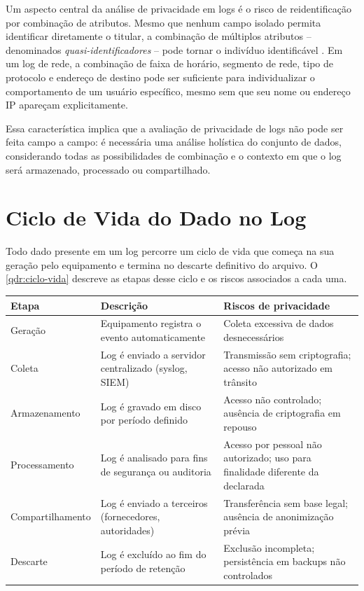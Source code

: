 Um aspecto central da análise de privacidade em logs é o risco de reidentificação por combinação de atributos. Mesmo que nenhum campo isolado permita identificar diretamente o titular, a combinação de múltiplos atributos -- denominados \textit{quasi-identificadores} -- pode tornar o indivíduo identificável \cite{sweeney2002kanonymity}. Em um log de rede, a combinação de faixa de horário, segmento de rede, tipo de protocolo e endereço de destino pode ser suficiente para individualizar o comportamento de um usuário específico, mesmo sem que seu nome ou endereço IP apareçam explicitamente.

Essa característica implica que a avaliação de privacidade de logs não pode ser feita campo a campo: é necessária uma análise holística do conjunto de dados, considerando todas as possibilidades de combinação e o contexto em que o log será armazenado, processado ou compartilhado.

\section{Ciclo de Vida do Dado no Log}
\label{sec:ciclo-vida}

Todo dado presente em um log percorre um ciclo de vida que começa na sua geração pelo equipamento e termina no descarte definitivo do arquivo. O \autoref{qdr:ciclo-vida} descreve as etapas desse ciclo e os riscos associados a cada uma.

\begin{quadro}[htb]
    \caption{\label{qdr:ciclo-vida}Ciclo de vida do dado em logs de infraestrutura}
    \begin{tabular}{|p{2.5cm}|p{4.5cm}|p{6.8cm}|}
        \hline
        \textbf{Etapa} & \textbf{Descrição} & \textbf{Riscos de privacidade} \\
        \hline
        Geração & Equipamento registra o evento automaticamente & Coleta excessiva de dados desnecessários \\
        \hline
        Coleta & Log é enviado a servidor centralizado (syslog, SIEM) & Transmissão sem criptografia; acesso não autorizado em trânsito \\
        \hline
        Armazenamento & Log é gravado em disco por período definido & Acesso não controlado; ausência de criptografia em repouso \\
        \hline
        Processamento & Log é analisado para fins de segurança ou auditoria & Acesso por pessoal não autorizado; uso para finalidade diferente da declarada \\
        \hline
        Compartilhamento & Log é enviado a terceiros (fornecedores, autoridades) & Transferência sem base legal; ausência de anonimização prévia \\
        \hline
        Descarte & Log é excluído ao fim do período de retenção & Exclusão incompleta; persistência em backups não controlados \\
        \hline
    \end{tabular}
\end{quadro}